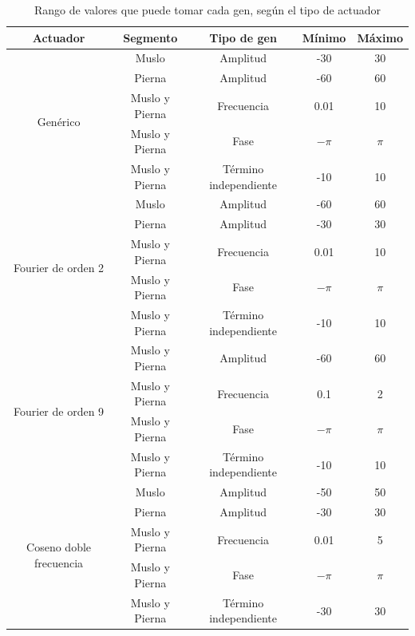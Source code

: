 \documentclass{article}
\begin{document}
\begin{table}[H]%
  \centering
  	\begin{tabular}{ | c | c | c || c | c | }
	  		\hline
	  		\textbf{Actuador} & \textbf{Segmento} & \textbf{Tipo de gen} & \textbf{M\'inimo} & \textbf{M\'aximo} \\
			\hline
			\multirow{5}{*}{Gen\'erico} & Muslo & Amplitud & -30 & 30\\ \cline{2-5}
								&Pierna & Amplitud & -60 & 60\\ \cline{2-5}
	  							& Muslo y Pierna & Frecuencia & 0.01 & 10 \\ \cline{2-5}
	  							&Muslo y Pierna & Fase & $-\pi$ & $\pi$ \\ \cline{2-5}
								& Muslo y Pierna & T\'ermino independiente & -10 & 10 \\ 
	  		\hline 
			\hline
			\multirow{5}{*}{Fourier de orden 2} & Muslo & Amplitud & -60 & 60\\ \cline{2-5}
	  							&Pierna & Amplitud & -30 & 30 \\ \cline{2-5}
								& Muslo y Pierna & Frecuencia & 0.01 & 10 \\ \cline{2-5}
	  							&Muslo y Pierna & Fase & $-\pi$ & $\pi$ \\ \cline{2-5}
								& Muslo y Pierna & T\'ermino independiente & -10 & 10 \\
	  		\hline
			\hline
			\multirow{4}{*}{Fourier de orden 9} & Muslo y Pierna & Amplitud & -60 & 60\\ \cline{2-5}
	  							& Muslo y Pierna & Frecuencia & 0.1 & 2 \\ \cline{2-5}
	  							&Muslo y Pierna & Fase & $-\pi$ & $\pi$ \\ \cline{2-5}
								& Muslo y Pierna & T\'ermino independiente & -10 & 10 \\
	  		\hline
			\hline
			\multirow{5}{*}{Coseno doble frecuencia} & Muslo & Amplitud & -50 & 50\\ \cline{2-5}
								& Pierna & Amplitud & -30 & 30\\ \cline{2-5}
	  							& Muslo y Pierna & Frecuencia & 0.01 & 5 \\ \cline{2-5}
	  							&Muslo y Pierna & Fase & $-\pi$ & $\pi$ \\ \cline{2-5}
								& Muslo y Pierna & T\'ermino independiente & -30 & 30 \\ \cline{2-5}
			\hline
	\end{tabular}
  \captionsetup{justification=centering}
  \caption{Rango de valores que puede tomar cada gen, seg\'un el tipo de actuador }%
  \label{table3}%
\end{table}
\end{document}
